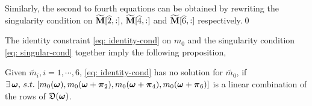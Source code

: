 Similarly, the second to fourth equations can be obtained by rewriting the singularity condition on $\widetilde{\mathbf{M}}[\widehat{2},:]$, $\widetilde{\mathbf{M}}[\widehat{4},:]$ and $\widetilde{\mathbf{M}}[\widehat{6},:]$ respectively.\qed

The identity constraint \eqref{eq: identity-cond} on $m_0$ and the singularity condition \eqref{eq: singular-cond} together imply the following proposition,
\begin{proposition}\label{prop: feasibility}
Given $\widetilde{m_i}, i = 1,\cdots,6$, \eqref{eq: identity-cond} has no solution for $\widetilde{m_0}$, if $\exists\,\boldsymbol{\omega}, \,s.t. \; [m_0(\boldsymbol{\omega}), m_0(\boldsymbol{\omega}+\boldsymbol{\pi}_2),m_0(\boldsymbol{\omega}+\boldsymbol{\pi}_4),m_0(\boldsymbol{\omega}+\boldsymbol{\pi}_6)]$ is a linear combination of the rows of $\mathfrak{D}(\boldsymbol{\omega})$.%
\end{proposition}


